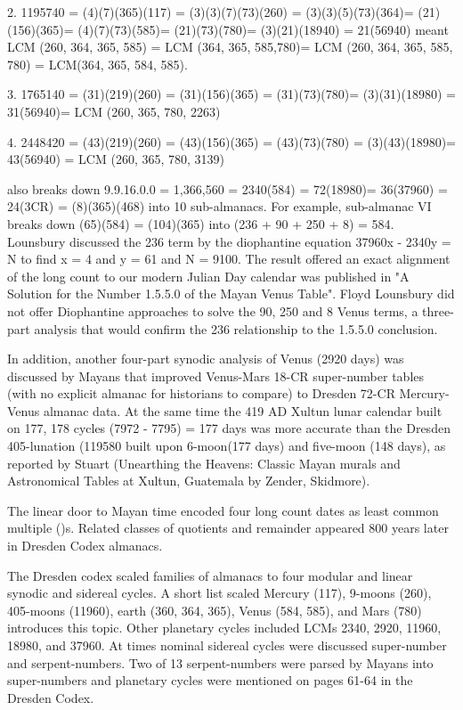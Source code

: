 \documentclass[12pt]{article}
\begin{document}
2. 1195740 = (4)(7)(365)(117) = (3)(3)(7)(73)(260) = (3)(3)(5)(73)(364)= (21)(156)(365)= (4)(7)(73)(585)= (21)(73)(780)= (3)(21)(18940) = 21(56940) meant LCM (260, 364, 365, 585) = LCM (364, 365, 585,780)= LCM (260, 364, 365, 585, 780) = LCM(364, 365, 584, 585).

3. 1765140 = (31)(219)(260) = (31)(156)(365) = (31)(73)(780)= (3)(31)(18980) = 31(56940)= LCM (260, 365, 780, 2263) 

4. 2448420  = (43)(219)(260) = (43)(156)(365) = (43)(73)(780) = (3)(43)(18980)= 43(56940) = LCM (260, 365, 780, 3139)

 also breaks  down 9.9.16.0.0 = 1,366,560 = 2340(584) = 72(18980)= 36(37960) = 24(3CR) = (8)(365)(468) into 10 sub-almanacs. For example, sub-almanac VI breaks down (65)(584) = (104)(365) into (236 + 90 + 250 + 8) = 584. Lounsbury discussed the 236 term by the diophantine equation 37960x - 2340y = N to find x = 4 and y = 61 and N = 9100. The result offered an exact alignment of the long count to our modern Julian Day calendar was published in "A Solution for the Number 1.5.5.0 of the Mayan Venus Table".  Floyd Lounsbury did not offer Diophantine approaches to solve the 90, 250 and 8 Venus terms, a three-part analysis that would confirm the 236 relationship to the 1.5.5.0 conclusion.

In addition, another four-part synodic analysis of Venus (2920 days) was discussed by Mayans that improved Venus-Mars 18-CR super-number tables (with no explicit almanac for historians to compare) to Dresden 72-CR Mercury-Venus almanac data. At the same time the 419 AD Xultun lunar calendar built on 177, 178 cycles (7972 - 7795) = 177 days was more accurate than the Dresden 405-lunation (119580 built upon 6-moon(177 days) and five-moon (148 days), as reported by Stuart (Unearthing the Heavens: Classic Mayan murals and Astronomical Tables at Xultun, Guatemala by Zender, Skidmore). 

The linear door to Mayan time encoded four long count dates as least common multiple ()s.  Related classes of quotients and remainder appeared 800 years later in Dresden Codex almanacs.  

The Dresden codex scaled families of almanacs to four modular and linear synodic and sidereal cycles. A short list scaled Mercury (117), 9-moons (260), 405-moons (11960), earth (360, 364, 365), Venus (584, 585), and Mars (780) introduces this topic. Other planetary cycles included LCMs 2340, 2920, 11960, 18980, and 37960. At times nominal sidereal cycles were discussed super-number and serpent-numbers. Two of 13 serpent-numbers were parsed by Mayans into super-numbers and planetary cycles were mentioned on pages 61-64 in the Dresden Codex.
\end{document}
